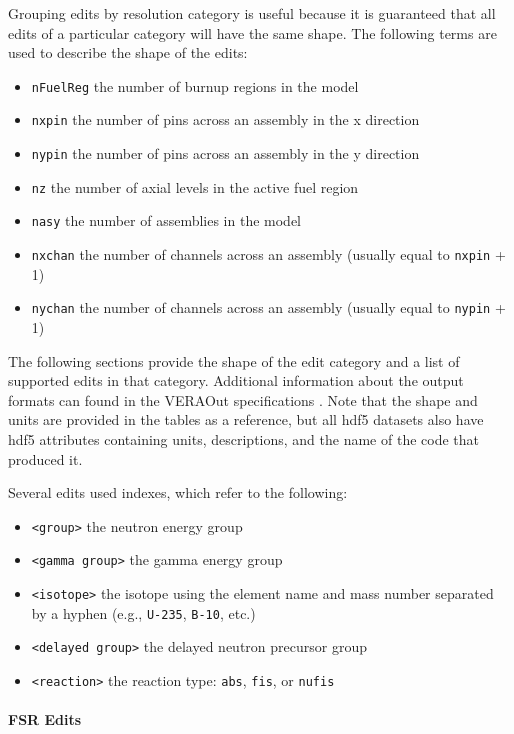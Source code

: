 Grouping edits by resolution category is useful because it is guaranteed that all edits of a particular category will have the same shape.  The following terms are used to describe the shape of the edits:
\begin{itemize}[noitemsep]
    \item \texttt{nFuelReg} the number of burnup regions in the model
    \item \texttt{nxpin} the number of pins across an assembly in the x direction
    \item \texttt{nypin} the number of pins across an assembly in the y direction
    \item \texttt{nz} the number of axial levels in the active fuel region
    \item \texttt{nasy} the number of assemblies in the model
    \item \texttt{nxchan} the number of channels across an assembly (usually equal to \texttt{nxpin} + 1)
    \item \texttt{nychan} the number of channels across an assembly (usually equal to \texttt{nypin} + 1)
\end{itemize}
The following sections provide the shape of the edit category and a list of supported edits in that category.  Additional information about the output formats can found in the VERAOut specifications \cite{godfrey2014}.  Note that the shape and units are provided in the tables as a reference, but all \ac{hdf5} datasets also have \ac{hdf5} attributes containing units, descriptions, and the name of the code that produced it.

Several edits used indexes, which refer to the following:
\begin{itemize}[noitemsep]
    \item \texttt{<group>} the neutron energy group
    \item \texttt{<gamma group>} the gamma energy group
    \item \texttt{<isotope>} the isotope using the element name and mass number separated by a hyphen (e.g., \texttt{U-235}, \texttt{B-10}, etc.)
    \item \texttt{<delayed group>} the delayed neutron precursor group
    \item \texttt{<reaction>} the reaction type: \texttt{abs}, \texttt{fis}, or \texttt{nufis}
\end{itemize}

\paragraph{FSR Edits}\label{sec:fsr-edits}

